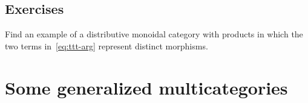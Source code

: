 \subsection*{Exercises}

\begin{ex}\label{ex:moncat-prod-coprod-context}
  Find an example of a distributive monoidal category with products in which the two terms in~\eqref{eq:ttt-arg} represent distinct morphisms.
\end{ex}


\section{Some generalized multicategories}
\label{sec:cartmulti}


